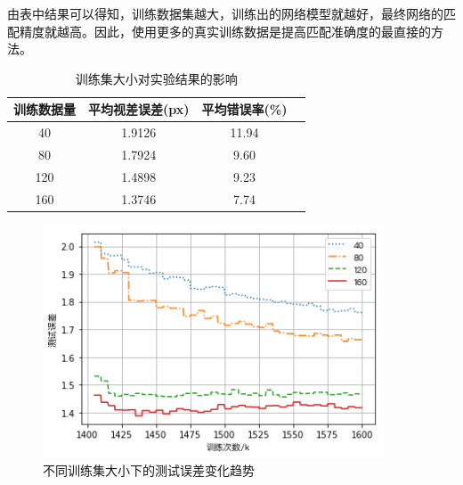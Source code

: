 由表中结果可以得知，训练数据集越大，训练出的网络模型就越好，最终网络的匹配精度就越高。因此，使用更多的真实训练数据是提高匹配准确度的最直接的方法。

\begin{table}[!htb]
	\centering
	\caption{训练集大小对实验结果的影响}
	\label{tab:4_3_kitti_dataset_size}
		\begin{tabular}{|c|c|c|c|}\hline
			训练数据量 & 平均视差误差(px) & 平均错误率(\%) \\\hline
			40               & 1.9126                   & 11.94                  \\
			80               & 1.7924                   & 9.60                   \\
			120             & 1.4898                  & 9.23                    \\
			160             & 1.3746                  & 7.74                    \\\hline
		\end{tabular}
\end{table}

\vspace{1in}

\begin{figure}[!htb]
	\centering\includegraphics[width=4in]{figures/4_3_kitti_dataset_size}
	\caption{不同训练集大小下的测试误差变化趋势}\label{fig:4_3_kitti_dataset_size}
\end{figure}



